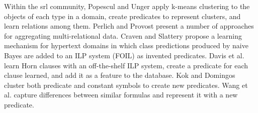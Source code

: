Within the \gls{srl} community,  Popescul and Unger \cite{Popescul2004} apply k-means clustering to the objects of each type in a domain, create predicates to represent clusters, and learn relations among them.
Perlich and Provost \cite{Perlich2003} present a number of approaches for aggregating multi-relational data.
Craven and Slattery \cite{Craven2001} propose a learning mechanism for hypertext domains in which class predictions produced by naive Bayes are added to an ILP system (FOIL) as invented predicates.
Davis et al. \cite{DavisOSBPC07} learn Horn clauses with an off-the-shelf ILP system, create a predicate for each clause learned, and add it as a feature to the database.
Kok and Domingos \cite{Kok2007} cluster both predicate and constant symbols to create new predicates.
Wang et al. \cite{WangMC15} capture differences between similar formulas and represent it with a new predicate.

 







\cleardoublepage

